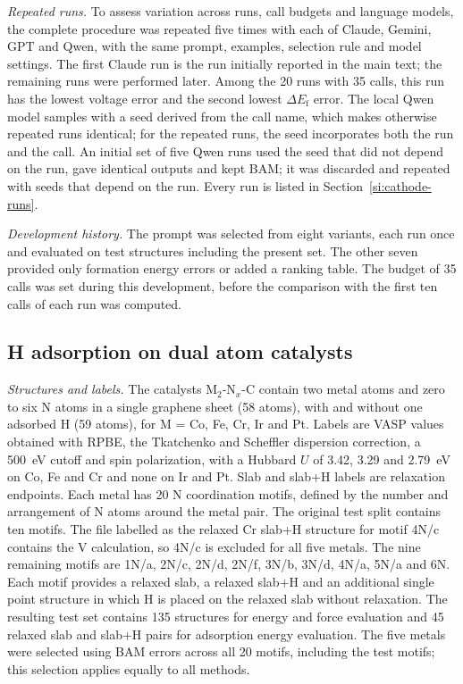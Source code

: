\textit{Repeated runs.} To assess variation across runs, call budgets and language models, the complete procedure was repeated five times with each of Claude, Gemini, GPT and Qwen, with the same prompt, examples, selection rule and model settings. The first Claude run is the run initially reported in the main text; the remaining runs were performed later. Among the 20 runs with 35 calls, this run has the lowest voltage error and the second lowest $\Delta E_\mathrm{f}$ error. The local Qwen model samples with a seed derived from the call name, which makes otherwise repeated runs identical; for the repeated runs, the seed incorporates both the run and the call. An initial set of five Qwen runs used the seed that did not depend on the run, gave identical outputs and kept BAM; it was discarded and repeated with seeds that depend on the run. Every run is listed in Section~\ref{si:cathode-runs}.

\textit{Development history.} The prompt was selected from eight variants, each run once and evaluated on test structures including the present set. The other seven provided only formation energy errors or added a ranking table. The budget of 35 calls was set during this development, before the comparison with the first ten calls of each run was computed.

\subsection{H adsorption on dual atom catalysts}
\label{si:app-catalyst}

\textit{Structures and labels.} The catalysts M$_2$-N$_x$-C contain two metal atoms and zero to six N atoms in a single graphene sheet (58 atoms), with and without one adsorbed H (59 atoms), for M = Co, Fe, Cr, Ir and Pt. Labels are VASP values obtained with RPBE, the Tkatchenko and Scheffler dispersion correction, a 500~eV cutoff and spin polarization, with a Hubbard $U$ of 3.42, 3.29 and 2.79~eV on Co, Fe and Cr and none on Ir and Pt. Slab and slab+H labels are relaxation endpoints. Each metal has 20 N coordination motifs, defined by the number and arrangement of N atoms around the metal pair. The original test split contains ten motifs. The file labelled as the relaxed Cr slab+H structure for motif 4N/c contains the V calculation, so 4N/c is excluded for all five metals. The nine remaining motifs are 1N/a, 2N/c, 2N/d, 2N/f, 3N/b, 3N/d, 4N/a, 5N/a and 6N. Each motif provides a relaxed slab, a relaxed slab+H and an additional single point structure in which H is placed on the relaxed slab without relaxation. The resulting test set contains 135 structures for energy and force evaluation and 45 relaxed slab and slab+H pairs for adsorption energy evaluation. The five metals were selected using BAM errors across all 20 motifs, including the test motifs; this selection applies equally to all methods.

